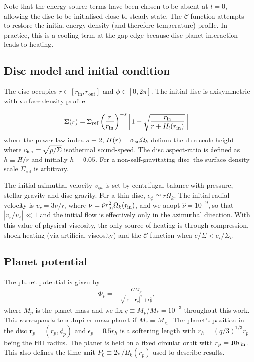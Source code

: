 Note that the energy source terms
have been chosen to be absent at $t=0$, allowing the disc to be
initialised close to steady state. The $\mathcal{C}$ function attempts
to restore the initial energy density (and 
therefore temperature) profile. In practice, this is a cooling term at
the gap edge because disc-planet interaction leads to heating.  

\subsection{Disc model and initial condition}
The disc occupies $r\in[r_\mathrm{in}, r_\mathrm{out}]$ and
$\phi\in[0,2\pi]$. The initial disc is axisymmetric with  
surface density profile  
 
\begin{align}\label{initial_density}
   \Sigma(r) = \Sigma_\mathrm{ref}\left(\frac{r}{r_\mathrm{in}}\right)^{-s}
    \left[1 - \sqrt{\frac{r_\mathrm{in}}{r + H_i(r_\mathrm{in})}}\,\right] 
\end{align}
where the power-law index $s=2$, $H(r) = c_\mathrm{iso}\Omega_k $ defines the disc scale-height 
where $c_\mathrm{iso}=\sqrt{p/\Sigma}$ isothermal sound-speed. The disc aspect-ratio is defined as $h\equiv H/r$ and initially
$h=0.05$. For a non-self-gravitating disc, the surface density scale
$\Sigma_\mathrm{ref}$ is arbitrary. 

The initial azimuthal velocity $v_{\phi i}$ is set by centrifugal balance with
pressure, stellar gravity and disc gravity. For a thin disc, 
$v_{\phi}\simeq r\Omega_k$. The initial radial velocity is
$v_{r}=3\nu/r$, where $\nu = \hat{\nu}r_\mathrm{in}^2\Omega_k(r_\mathrm{in})$, and we
adopt $\hat{\nu}= 10^{-9}$, so that $|v_{r}/v_{\phi}|\ll1$ and the initial 
flow is effectively only in the azimuthal direction.  With this value 
of physical viscosity, the only source of heating is through
compression, shock-heating (via artificial viscosity) and the
$\mathcal{C}$ function when $e/\Sigma<e_i/\Sigma_i$. 

\subsection{Planet potential}\label{planet_config}
The planet potential is given by 
\begin{align}
  \Phi_p = -\frac{GM_p}{\sqrt{|\bm{r} - \bm{r}_p|^2 + \epsilon_p^2}},
\end{align}
where $M_p$ is the planet mass and we fix $q\equiv M_p/M_*=10^{-3}$
throughout this work. This corresponds to a Jupiter-mass planet if $M_*=M_{\sun}$. 
The planet's position in the disc 
$\bm{r}_p=(r_p,\phi_p)$  and $\epsilon_p=0.5r_h$ is a softening
length with $r_h=(q/3)^{1/3}r_p$ being the Hill radius.  
The planet is held on a fixed circular orbit with $ r_p = 10r_\mathrm{in}$. This also
defines the time unit $P_0\equiv 2\pi/\Omega_k(r_p)$ used to describe results. 


